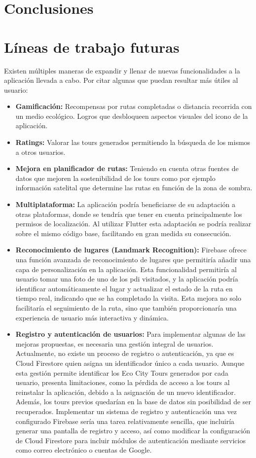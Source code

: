 \section*{Conclusiones}
\section*{Líneas de trabajo futuras}
Existen múltiples maneras de expandir y llenar de nuevas funcionalidades a la aplicación llevada a cabo.
Por citar algunas que puedan resultar más útiles al usuario:
\begin{itemize}
    \item \textbf{Gamificación:} Recompensas por rutas completadas o distancia recorrida con un medio ecológico. Logros que desbloqueen aspectos visuales del icono de la aplicación.
    \item \textbf{Ratings:} Valorar las tours generados permitiendo la búsqueda de los mismos a otros usuarios.
    \item \textbf{Mejora en planificador de rutas:} Teniendo en cuenta otras fuentes de datos que mejoren la sostenibilidad de los tours como por ejemplo información satelital que determine las rutas en función de la zona de sombra.
    \item \textbf{Multiplataforma:} La aplicación podría beneficiarse de su adaptación a otras plataformas, donde se tendría que tener en cuenta principalmente los permisos de localización. Al utilizar Flutter esta adaptación se podría realizar sobre el mismo código base, facilitando en gran medida su consecución.
	\item \textbf{Reconocimiento de lugares (Landmark Recognition):} Firebase ofrece una función avanzada de reconocimiento de lugares \cite{firebase_mlkit_landmarks} que permitiría añadir una capa de personalización en la aplicación. Esta funcionalidad permitiría al usuario tomar una foto de uno de los \acrlong{pdi} visitados, y la aplicación podría identificar automáticamente el lugar y actualizar el estado de la ruta en tiempo real, indicando que se ha completado la visita. Esta mejora no solo facilitaría el seguimiento de la ruta, sino que también proporcionaría una experiencia de usuario más interactiva y dinámica.
	\item \textbf{Registro y autenticación de usuarios:} Para implementar algunas de las mejoras propuestas, es necesaria una gestión integral de usuarios. Actualmente, no existe un proceso de registro o autenticación, ya que es Cloud Firestore quien asigna un identificador único a cada usuario. Aunque esta gestión permite identificar los Eco City Tours generados por cada usuario, presenta limitaciones, como la pérdida de acceso a los tours al reinstalar la aplicación, debido a la asignación de un nuevo identificador. Además, los tours previos quedarían en la base de datos sin posibilidad de ser recuperados. Implementar un sistema de registro y autenticación una vez configurado Firebase sería una tarea relativamente sencilla, que incluiría generar una pantalla de registro y acceso, así como modificar la configuración de Cloud Firestore para incluir módulos de autenticación mediante servicios como correo electrónico o cuentas de Google.
\end{itemize}